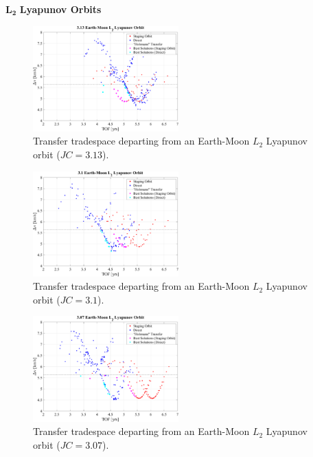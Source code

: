 $\pmb{L_{2}}$ \textbf{Lyapunov Orbits}
\begin{figure}[ht]
    \centering
    \includegraphics[width=0.5\textwidth]{figures/TradeSpace_L2Lyapunov_3_13.pdf}
    \caption{Transfer tradespace departing from an Earth-Moon $L_{2}$ Lyapunov orbit ($JC=3.13$).}
\end{figure}

\begin{figure}[ht]
    \centering
    \includegraphics[width=0.5\textwidth]{figures/TradeSpace_L2Lyapunov_3_10.pdf}
    \caption{Transfer tradespace departing from an Earth-Moon $L_{2}$ Lyapunov orbit ($JC=3.1$).}
\end{figure}
\clearpage

\begin{figure}[ht]
    \centering
    \includegraphics[width=0.5\textwidth]{figures/TradeSpace_L2Lyapunov_3_07.pdf}
    \caption{Transfer tradespace departing from an Earth-Moon $L_{2}$ Lyapunov orbit ($JC=3.07$).}
\end{figure}


